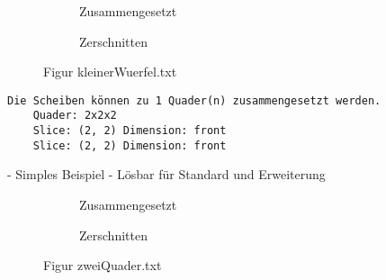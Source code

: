 \documentclass[a4paper,10pt,ngerman]{scrartcl}
\newcommand{\simplecube}[8]%
{
    \begin{scope}[shift={#1}]
        \fill[gray!40,canvas is yz plane at x=#2, opacity=#8] (0,0) rectangle (#3,#4);
        \fill[gray!10,canvas is xz plane at y=#3, opacity=#8] (0,0) rectangle (#2,#4);
        \fill[white  ,canvas is xy plane at z=#4, opacity=#8] (0,0) rectangle (#2,#3);
        \foreach\i/\j in {0/1, 1/1, 1/0}
            {
            \draw[line#5] (0,#3*\i,#4*\j) --++ (#2,0,0);
            \draw[line#6] (#2*\i,0,#4*\j) --++ (0,#3,0);
            \draw[line#7] (#2*\i,#3*\j,0) --++ (0,0,#4);
        }
    \end{scope}
}
\newcommand{\smallSquare}[4]%
{
    \begin{scope}[shift={#1}]
        \simplecube{(0,     0,      0)}     {1}{2}{2}   {a}{a}{a}   {1}
        \simplecube{(1+#4,   0,      0))}    {1}{2}{2}   {a}{a}{a}   {1}
    \end{scope}
}
\newcommand{\unsolvedSquare}[4]%
{
    \begin{scope}[shift={#1}]
        \simplecube{(0,     0,      0)}     {1}{2}{2}   {a}{a}{a}   {1}
        \simplecube{(1+#4,   0,      0))}    {1}{2}{2}   {a}{a}{a}   {1}
        \simplecube{(2+2*#4,   0,      0))}    {1}{1}{1}   {a}{a}{a}   {1}
    \end{scope}
}
\begin{document}
    \begin{figure}[H]
        \centering
        \def\a{3.2}
        \def\b{1.2}
        \begin{subfigure}[b]{0.45\textwidth}
            \centering %
            \caption{Zusammengesetzt}\label{fig:figA2}
        \end{subfigure}
        \begin{subfigure}[b]{0.45\textwidth}
            \centering %
            \caption{Zerschnitten}\label{fig:figB2}
        \end{subfigure}
        \caption{Figur kleinerWuerfel.txt}\label{fig:figAB2}
    \end{figure}

    \begin{lstlisting}[frame=single, title=Programmausgabe kleinerWuerfel.txt, breaklines=true,label={lst:lstlisting3}]
    Die Scheiben können zu 1 Quader(n) zusammengesetzt werden.
    Quader: 2x2x2
    Slice: (2, 2) Dimension: front
    Slice: (2, 2) Dimension: front
    \end{lstlisting}

    - Simples Beispiel
    - Lösbar für Standard und Erweiterung



    \begin{figure}[H]
        \centering
        \def\a{3.2}
        \def\b{1.2}
        \begin{subfigure}[b]{0.45\textwidth}
            \centering %
            \caption{Zusammengesetzt}\label{fig:figA3}
        \end{subfigure}
        \begin{subfigure}[b]{0.45\textwidth}
            \centering %
            \caption{Zerschnitten}\label{fig:figB3}
        \end{subfigure}
        \caption{Figur zweiQuader.txt}\label{fig:figAB3}
    \end{figure}
\end{document}
